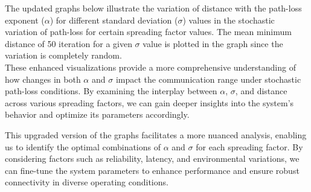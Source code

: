 The updated graphs below illustrate the variation of distance with the path-loss exponent ($\alpha$) for different standard deviation ($\sigma$) values in the stochastic variation of path-loss for certain spreading factor values. The mean minimum distance of 50 iteration for a given $\sigma$ value is plotted in the graph since the variation is completely random.\\

These enhanced visualizations provide a more comprehensive understanding of how changes in both $\alpha$ and $\sigma$ impact the communication range under stochastic path-loss conditions. By examining the interplay between $\alpha$, 
$\sigma$, and distance across various spreading factors, we can gain deeper insights into the system's behavior and optimize its parameters accordingly.

This upgraded version of the graphs facilitates a more nuanced analysis, enabling us to identify the optimal combinations of $\alpha$ and $\sigma$ for each spreading factor. By considering factors such as reliability, latency, and environmental variations, we can fine-tune the system parameters to enhance performance and ensure robust connectivity in diverse operating conditions.

